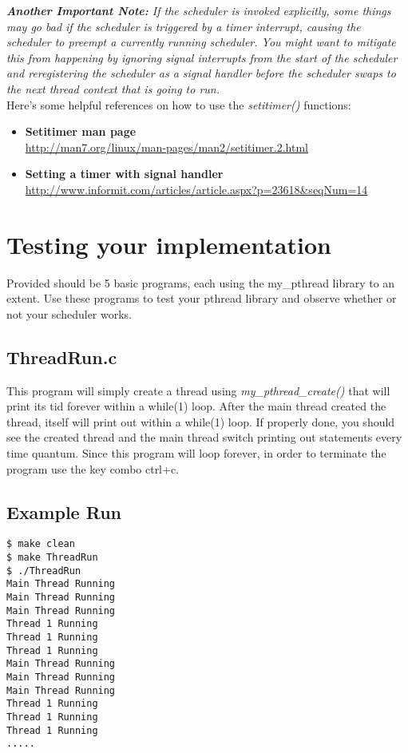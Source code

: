 \documentclass{article}
\begin{document}
\noindent \textit{\textbf{Another Important Note:} If the scheduler is invoked explicitly, some things may go bad if the scheduler is triggered by a timer interrupt, causing the scheduler to preempt a currently running scheduler. You might want to mitigate this from happening by ignoring signal interrupts from the start of the scheduler and reregistering the scheduler as a signal handler before the scheduler swaps to the next thread context that is going to run.}\\

\noindent Here’s some helpful references on how to use the \textit{setitimer()} functions:
\begin{itemize}
\item \textbf{Setitimer man page}\\ \href{http://man7.org/linux/man-pages/man2/setitimer.2.html
}{http://man7.org/linux/man-pages/man2/setitimer.2.html
}
\item \textbf{Setting a timer with signal handler}\\ \href{http://www.informit.com/articles/article.aspx?p=23618&seqNum=14}{http://www.informit.com/articles/article.aspx?p=23618\&seqNum=14}
\end{itemize}



\section{Testing your implementation}
Provided should be 5 basic programs, each using the my\_pthread library to an extent. Use these programs to test your pthread library and observe whether or not your scheduler works.

\subsection{ThreadRun.c}
This program will simply create a thread using \textit{my\_pthread\_create()} that will print its tid forever within a while(1) loop. After the main thread created the thread, itself will print out within a while(1) loop. If properly done, you should see the created thread and the main thread switch printing out statements every time quantum. Since this program will loop forever, in order to terminate the program use the key combo ctrl+c.

\subsection*{Example Run}
\begin{commandline}
	\begin{verbatim}
$ make clean
$ make ThreadRun
$ ./ThreadRun
Main Thread Running 
Main Thread Running 
Main Thread Running 
Thread 1 Running 
Thread 1 Running 
Thread 1 Running 
Main Thread Running 
Main Thread Running 
Main Thread Running 
Thread 1 Running 
Thread 1 Running 
Thread 1 Running 
.....
	\end{verbatim}
\end{commandline}
\end{document}
